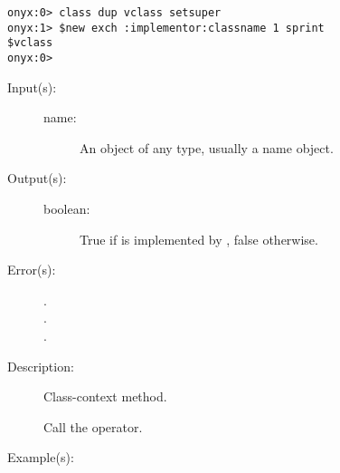 \begin{description}
\begin{description}
\begin{verbatim}
onyx:0> class dup vclass setsuper
onyx:1> $new exch :implementor:classname 1 sprint
$vclass
onyx:0>
		\end{verbatim}
	\end{description}
\label{vclass:implements}
\item[{\onyxop{name}{implements}{boolean}}: ]
	\begin{description}\item[]
	\item[Input(s): ]
		\begin{description}\item[]
		\item[name: ]
			An object of any type, usually a name object.
		\end{description}
	\item[Output(s): ]
		\begin{description}\item[]
		\item[boolean: ]
			True if  is implemented by ,
			false otherwise.
		\end{description}
	\item[Error(s): ]
		\begin{description}\item[]
		\item[.]
		\item[.]
		\item[.]
		\end{description}
	\item[Description: ]
		Class-context method.

		Call the
		operator.
	\item[Example(s): ]\begin{verbatim}


\end{verbatim}
\end{description}
\end{description}

